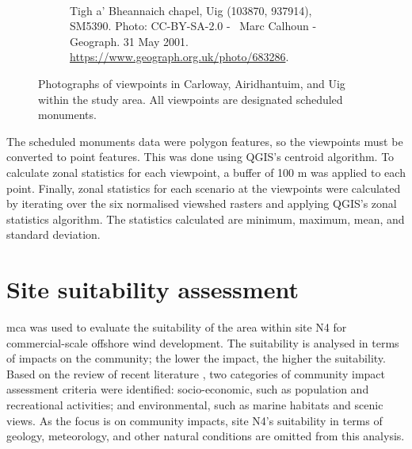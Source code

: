 \begin{figure}
\begin{subfigure}[t]{.48\textwidth}
  \end{subfigure}
  \\[.5cm]
  \begin{subfigure}[t]{.48\textwidth}
    \caption*{Tigh a' Bheannaich chapel, Uig (103870, 937914), SM5390. Photo: CC-BY-SA-2.0 - \textcopyright~Marc Calhoun - Geograph. 31 May 2001. \url{https://www.geograph.org.uk/photo/683286}.}
  \end{subfigure}
  \caption{Photographs of viewpoints in Carloway, Airidhantuim, and Uig within the study area. All viewpoints are designated scheduled monuments. \label{fig:viewpoints2}}
\end{figure}

The scheduled monuments data were polygon features, so the viewpoints must be converted to point features. This was done using QGIS's centroid algorithm. To calculate zonal statistics for each viewpoint, a buffer of 100 m was applied to each point. Finally, zonal statistics for each scenario at the viewpoints were calculated by iterating over the six normalised viewshed rasters and applying QGIS's zonal statistics algorithm. The statistics calculated are minimum, maximum, mean, and standard deviation.

\clearpage
\section{Site suitability assessment}

\gls{mca} was used to evaluate the suitability of the area within site N4 for commercial-scale offshore wind development. The suitability is analysed in terms of impacts on the community; the lower the impact, the higher the suitability. Based on the review of recent literature \autocite{gaveriaux2019,mekonnen2015,vasileiou2017,tercan2020,deveci2020,mahdy2018,basset2021}, two categories of community impact assessment criteria were identified: socio-economic, such as population and recreational activities; and environmental, such as marine habitats and scenic views. As the focus is on community impacts, site N4's suitability in terms of geology, meteorology, and other natural conditions are omitted from this analysis.

